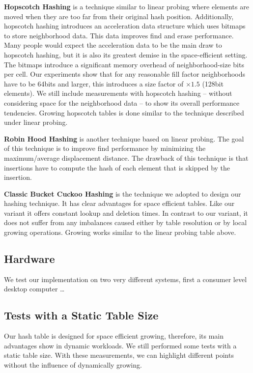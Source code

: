 \documentclass[a4paper,UKenglish]{lipics-v2016}
\begin{document}
\textbf{Hopscotch Hashing} is a technique similar to linear probing where
elements are moved when they are too far from their original hash
position.  Additionally, hopscotch hashing introduces an acceleration
data structure which uses bitmaps to store neighborhood data. This
data improves find and erase performance.  Many people would expect
the acceleration data to be the main draw to hopscotch hashing, but it
is also its greatest demise in the space-efficient setting.  The
bitmaps introduce a significant memory overhead of neighborhood-size
bits per cell.  Our experiments show that for any reasonable fill
factor neighborhoods have to be 64bits and larger, this introduces a
size factor of $\times1.5$ (128bit elements).  We still include
measurements with hopscotch hashing -- without considering space for
the neighborhood data -- to show its overall performance tendencies.
Growing hopscotch tables is done similar to the technique described
under linear probing.

\textbf{Robin Hood Hashing} is another technique based on linear probing. The
goal of this technique is to improve find performance by minimizing
the maximum/average displacement distance.  The drawback of this technique is
that insertions have to compute the hash of each element that is
skipped by the insertion.

\textbf{Classic Bucket Cuckoo Hashing} is the technique we adopted to design
our hashing technique.  It has clear advantages for space efficient
tables.  Like our variant it offers constant lookup and deletion
times.  In contrast to our variant, it does not suffer from any
imbalances caused either by table resolution or by local growing
operations.  Growing works similar to the linear probing table above.

\subsection{Hardware}
We test our implementation on two very different systems, first a
consumer level desktop computer \ldots{}

\subsection{Tests with a Static Table Size}
Our hash table is designed for space efficient growing, therefore, its
main advantages show in dynamic workloads.  We still performed some
tests with a static table size.  With these measurements, we can
highlight different points without the influence of dynamically growing.
\end{document}
